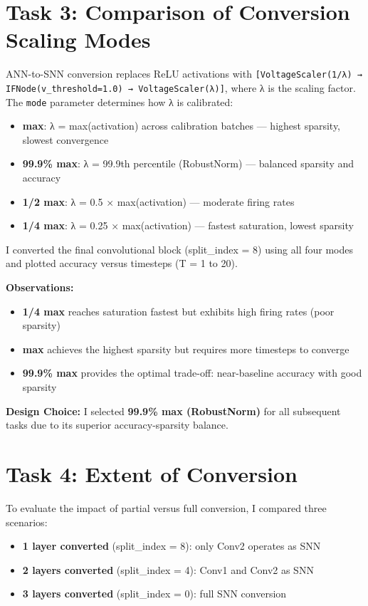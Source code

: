 \documentclass[11pt, a4paper]{article}
\begin{document}
\section{Task 3: Comparison of Conversion Scaling Modes}

ANN-to-SNN conversion replaces ReLU activations with \texttt{[VoltageScaler(1/λ) → IFNode(v\_threshold=1.0) → VoltageScaler(λ)]}, where λ is the scaling factor. The \texttt{mode} parameter determines how λ is calibrated:

\begin{itemize}
    \item \textbf{max}: λ = max(activation) across calibration batches — highest sparsity, slowest convergence
    \item \textbf{99.9\% max}: λ = 99.9th percentile (RobustNorm) — balanced sparsity and accuracy
    \item \textbf{1/2 max}: λ = 0.5 × max(activation) — moderate firing rates
    \item \textbf{1/4 max}: λ = 0.25 × max(activation) — fastest saturation, lowest sparsity
\end{itemize}

I converted the final convolutional block (split\_index = 8) using all four modes and plotted accuracy versus timesteps (T = 1 to 20).

\textbf{Observations:}
\begin{itemize}
    \item \textbf{1/4 max} reaches saturation fastest but exhibits high firing rates (poor sparsity)
    \item \textbf{max} achieves the highest sparsity but requires more timesteps to converge
    \item \textbf{99.9\% max} provides the optimal trade-off: near-baseline accuracy with good sparsity
\end{itemize}

\textbf{Design Choice:} I selected \textbf{99.9\% max (RobustNorm)} for all subsequent tasks due to its superior accuracy-sparsity balance.

\section{Task 4: Extent of Conversion}

To evaluate the impact of partial versus full conversion, I compared three scenarios:
\begin{itemize}
    \item \textbf{1 layer converted} (split\_index = 8): only Conv2 operates as SNN
    \item \textbf{2 layers converted} (split\_index = 4): Conv1 and Conv2 as SNN
    \item \textbf{3 layers converted} (split\_index = 0): full SNN conversion
\end{itemize}
\end{document}
